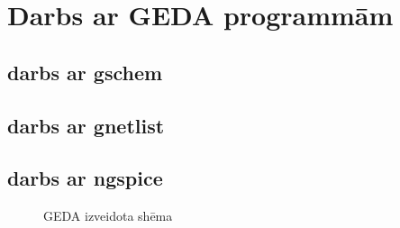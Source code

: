 \documentclass{report}
\begin{document}
\section{Darbs ar GEDA programmām}

\subsection{darbs ar gschem}




\subsection{darbs ar gnetlist}

\subsection{darbs ar ngspice}

\begin{figure}[!tb]
\caption{GEDA izveidota shēma}
\label{i:example}
\end{figure}
\end{document}
